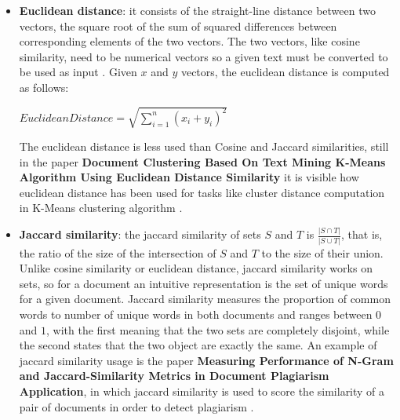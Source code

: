 \documentclass[\main/main.tex]{subfiles}
\begin{document}
\begin{itemize}
\begin{itemize}
    \end{itemize}
    \item \textbf{Euclidean distance}: it consists of the straight-line distance between two vectors, the square root of the sum of squared differences between corresponding elements of the two vectors. The two vectors, like cosine similarity, need to be numerical vectors so a given text must be converted to be used as input \cite{Gomaa2013ASO}. Given $x$ and $y$ vectors, the euclidean distance is computed as follows:
    \begin{center}
        $Euclidean Distance = \sqrt{\sum\limits_{i=1}^n (x_i+y_i)^2}$
    \end{center}
    The euclidean distance is less used than Cosine and Jaccard similarities, still in the paper \textbf{Document Clustering Based On Text Mining K-Means Algorithm Using Euclidean Distance Similarity} it is visible how euclidean distance has been used for tasks like cluster distance computation in K-Means clustering algorithm \cite{Lydia2018DocumentCB}.
    \item \textbf{Jaccard similarity}: the jaccard similarity of sets $S$ and $T$ is $\frac{| S \cap T|}{|S \cup T|}$, that is, the ratio of the size of the intersection of $S$ and $T$ to the size of their union.\cite{leskovec_rajaraman_ullman_2020}\cite{Gomaa2013ASO}\\
    Unlike cosine similarity or euclidean distance, jaccard similarity works on sets, so for a document an intuitive representation is the set of unique words for a given document. Jaccard similarity measures the proportion of common words to number of unique words in both documents and ranges between $0$ and $1$, with the first meaning that the two sets are completely disjoint, while the second states that the two object are exactly the same. An example of jaccard similarity usage is the paper \textbf{Measuring Performance of N-Gram and Jaccard-Similarity Metrics in Document Plagiarism Application}, in which jaccard similarity is used to score the similarity of a pair of documents in order to detect plagiarism \cite{Eka_Diana_2019}.
\end{itemize}
\end{document}
